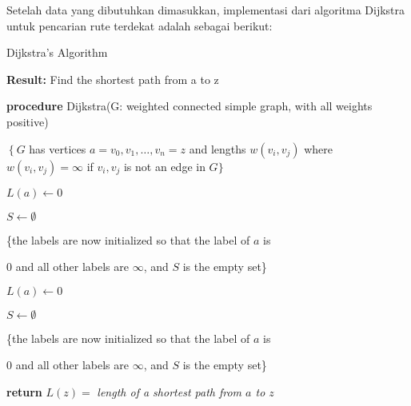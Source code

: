 \documentclass[10pt, conference]{IEEEtran}
\begin{document}
Setelah data yang dibutuhkan dimasukkan, implementasi dari algoritma Dijkstra untuk pencarian rute terdekat adalah sebagai berikut:

\begin{algorithm}

\caption{Dijkstra’s Algorithm}
\label{alg:two}

\textbf{Result:} Find the shortest path from a to $\mathrm{z}$

\textbf{procedure} Dijkstra(G: weighted connected simple graph, with all weights positive)

$\left\{G\right.$ has vertices $a=v_{0}, v_{1}, \ldots, v_{n}=z$ and lengths $w\left(v_{i}, v_{j}\right)$ where $w\left(v_{i}, v_{j}\right)=\infty$ if $v_{i}, v_{j}$ is not an edge in $G\}$


$L(a)\gets0$

$S\gets\emptyset$

\{the labels are now initialized so that the label of $a$ is

0 and all other labels are $\infty$, and $S$ is the empty set\}


$L(a)\gets0$

$S\gets\emptyset$

\{the labels are now initialized so that the label of $a$ is

0 and all other labels are $\infty$, and $S$ is the empty set\}

\textbf{return} $L(z) =$ \emph{length of a shortest path from $a$ to $z$}
\end{algorithm}
\end{document}
